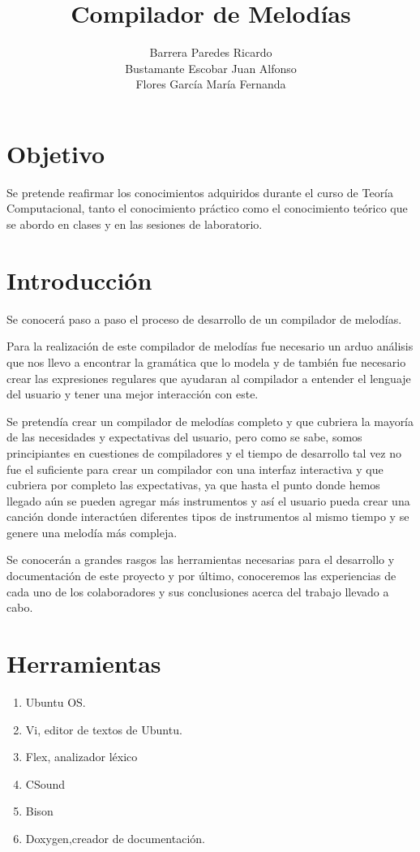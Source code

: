 \documentclass[12pt]{article}
\title{\textbf{Compilador de Melodías}}
\author{Barrera Paredes Ricardo\\
Bustamante Escobar Juan Alfonso\\
Flores García María Fernanda\\
  	}
\date{}
\begin{document}
\maketitle

\section{Objetivo}

Se pretende reafirmar los conocimientos adquiridos durante el curso de Teoría Computacional, tanto el conocimiento práctico como el conocimiento teórico que se abordo en clases y en las sesiones de laboratorio.

\section{Introducción}
Se conocerá paso a paso el proceso de desarrollo de un compilador de melodías. 

Para la realización de este compilador de melodías fue necesario un arduo análisis que nos llevo a encontrar la gramática que lo modela y de también fue necesario crear las expresiones regulares que ayudaran al compilador a entender el lenguaje del usuario y tener una mejor interacción con este. 

Se pretendía crear un compilador de melodías completo y que cubriera la mayoría de las necesidades y expectativas del usuario, pero como se sabe, somos principiantes en cuestiones de compiladores y el tiempo de desarrollo tal vez no fue el suficiente para crear un compilador con una interfaz interactiva y que cubriera por completo  las expectativas, ya que hasta el punto donde hemos llegado aún se pueden agregar más instrumentos y así el usuario pueda crear una canción donde interactúen diferentes tipos de instrumentos al mismo tiempo y se genere una melodía más compleja.

Se conocerán a grandes rasgos las herramientas necesarias para el desarrollo y documentación de este proyecto y por último, conoceremos las experiencias de cada uno de los colaboradores y sus conclusiones acerca del trabajo llevado a cabo.

\section{Herramientas}

\begin{enumerate}

\item Ubuntu OS.\\
\item Vi, editor de textos de Ubuntu.\\
\item Flex, analizador léxico\\
\item CSound\\
\item Bison\\
\item Doxygen,creador de documentación.\\

\end{enumerate}
\end{document}
